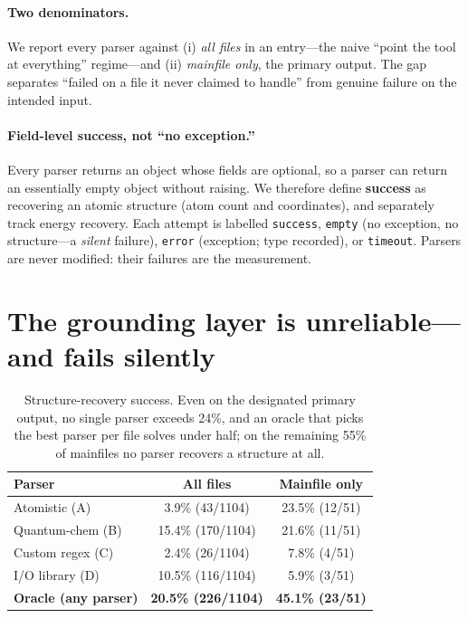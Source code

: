 \documentclass{article}
\begin{document}
\paragraph{Two denominators.} We report every parser against (i) \emph{all files}
in an entry---the naive ``point the tool at everything'' regime---and (ii)
\emph{mainfile only}, the primary output. The gap separates ``failed on a file it
never claimed to handle'' from genuine failure on the intended input.

\paragraph{Field-level success, not ``no exception.''} Every parser returns an
object whose fields are optional, so a parser can return an essentially empty
object without raising. We therefore define \textbf{success} as recovering an
atomic structure (atom count and coordinates), and separately track energy
recovery. Each attempt is labelled \texttt{success}, \texttt{empty} (no exception,
no structure---a \emph{silent} failure), \texttt{error} (exception; type
recorded), or \texttt{timeout}. Parsers are never modified: their failures are the
measurement.

\section{The grounding layer is unreliable---and fails silently}
\label{sec:results}

\begin{table}[t]
\centering
\small
\begin{tabular}{lcc}
\toprule
Parser & All files & Mainfile only \\
\midrule
Atomistic (A)      & 3.9\% (43/1104)  & 23.5\% (12/51) \\
Quantum-chem (B)   & 15.4\% (170/1104)& 21.6\% (11/51) \\
Custom regex (C)   & 2.4\% (26/1104)  & 7.8\% (4/51)   \\
I/O library (D)    & 10.5\% (116/1104)& 5.9\% (3/51)   \\
\midrule
\textbf{Oracle (any parser)} & \textbf{20.5\% (226/1104)} & \textbf{45.1\% (23/51)} \\
\bottomrule
\end{tabular}
\caption{Structure-recovery success. Even on the designated primary output, no
single parser exceeds 24\%, and an oracle that picks the best parser per file
solves under half; on the remaining 55\% of mainfiles no parser recovers a
structure at all.}
\label{tab:reliability}
\end{table}
\end{document}
